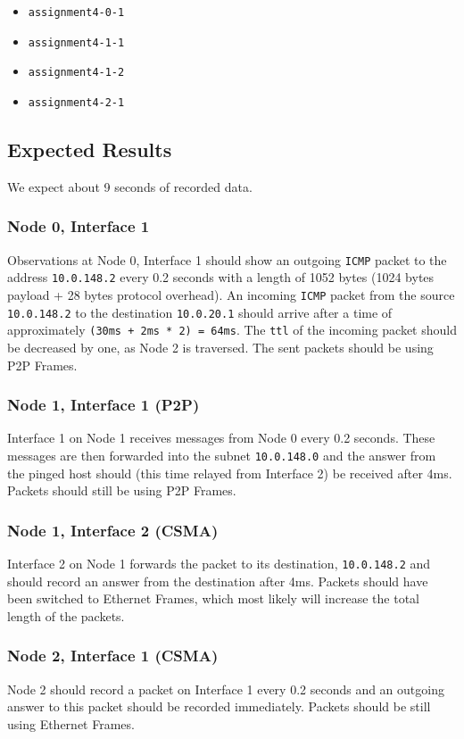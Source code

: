 \documentclass[parskip=full]{scrartcl}
\begin{document}
\begin{itemize}[noitemsep]
    \item \texttt{assignment4-0-1}
    \item \texttt{assignment4-1-1}
    \item \texttt{assignment4-1-2}
    \item \texttt{assignment4-2-1}
\end{itemize}

\subsection{Expected Results}
We expect about 9 seconds of recorded data. 
\subsubsection{Node 0, Interface 1}
Observations at Node 0, Interface 1 should show an outgoing \texttt{ICMP} packet to the address \texttt{10.0.148.2} every 0.2 seconds with a length of 1052 bytes (1024 bytes payload + 28 bytes protocol overhead).
An incoming \texttt{ICMP} packet from the source \texttt{10.0.148.2} to the destination \texttt{10.0.20.1} should arrive after a time of approximately \texttt{(30ms + 2ms * 2) = 64ms}.
The \texttt{ttl} of the incoming packet should be decreased by one, as Node 2 is traversed.
The sent packets should be using P2P Frames. 

\subsubsection{Node 1, Interface 1 (P2P)}
Interface 1 on Node 1 receives messages from Node 0 every 0.2 seconds.
These messages are then forwarded into the subnet \texttt{10.0.148.0} and the answer from the pinged host should (this time relayed from Interface 2) be received after 4ms.
Packets should still be using P2P Frames.
\subsubsection{Node 1, Interface 2 (CSMA)}
Interface 2 on Node 1 forwards the packet to its destination, \texttt{10.0.148.2} and should record an answer from the destination after 4ms.
Packets should have been switched to Ethernet Frames, which most likely will increase the total length of the packets.
\subsubsection{Node 2, Interface 1 (CSMA)}
Node 2 should record a packet on Interface 1 every 0.2 seconds and an outgoing answer to this packet should be recorded immediately.
Packets should be still using Ethernet Frames.
\end{document}
